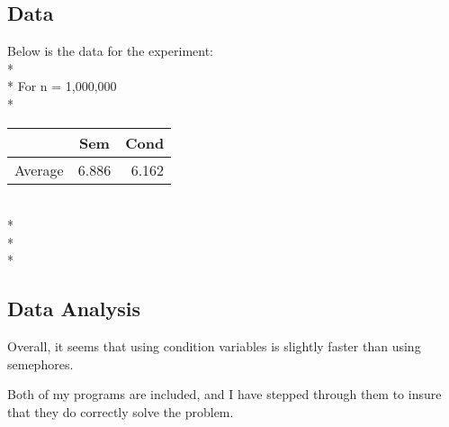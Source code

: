\documentclass[dvips]{article}
\begin{document}
\subsection{Data}
Below is the data for the experiment:
\\*
\\*
For n = 1,000,000
\\*
\begin{tabular}{ l | c r }
   & Sem & Cond \\
  \hline
  Average & 6.886 &  6.162\\
  \hline

\end{tabular}
\\*
\\*
\\*
\subsection{Data Analysis}

Overall, it seems that using condition variables is slightly faster than using semephores.

Both of my programs are included, and I have stepped through them to insure that they do correctly solve the problem.
\end{document}
